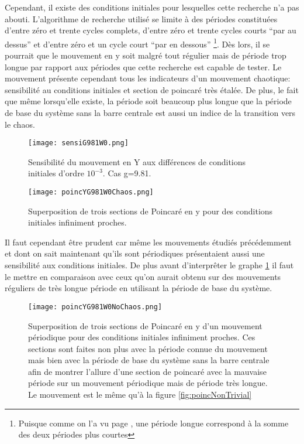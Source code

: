 \documentclass[a4paper]{report}
\begin{document}
Cependant, il existe des conditions initiales pour lesquelles cette recherche n'a pas abouti. L'algorithme de recherche utilisé se limite à des périodes constituées d'entre zéro et trente cycles complets, d'entre zéro et trente cycles courts ``par au dessus'' et d'entre zéro et un cycle court ``par en dessous'' \footnote{Puisque comme on l'a vu page \pageref{propr:sommePeriodes}, une période longue correspond à la somme des deux périodes plus courtes}. Dès lors, il se pourrait que le mouvement en y soit malgré tout régulier mais de période trop longue par rapport aux périodes que cette recherche est capable de tester. Le mouvement présente cependant tous les indicateurs d'un mouvement chaotique: sensibilité au conditions initiales et section de poincaré très étalée. De plus, le fait que même lorsqu'elle existe, la période soit beaucoup plus longue que la période de base du système sans la barre centrale est aussi un indice de la transition vers le chaos.
\begin{figure}[h!]
   \texttt{[image: sensiG981W0.png]}
      \caption[Sensibilité aux conditions initiales: g=9.81 .]{Sensibilité du mouvement en Y aux différences de conditions initiales d'ordre \(10^{-3}\). Cas g=9.81.}
\end{figure}
\begin{figure}[h!]
   \texttt{[image: poincYG981W0Chaos.png]}
      \caption[Section de Poincaré en y: g=9.81 ]{Superposition de trois sections de Poincaré en y pour des conditions initiales infiniment proches.\label{fig:poincGChaos}}
\end{figure}
Il faut cependant être prudent car même les mouvements étudiés précédemment et dont on sait maintenant qu'ils sont périodiques présentaient aussi une sensibilité aux conditions initiales. De plus avant d'interprêter le graphe \ref{fig:poincGChaos} il faut le mettre en comparaison avec ceux qu'on aurait obtenu sur des mouvements réguliers de très longue période en utilisant la période de base du système.
\begin{figure}[h!]
   \texttt{[image: poincYG981W0NoChaos.png]}
      \caption[Section de Poincaré en y d'un mouvement périodique: g=9.81 ]{Superposition de trois sections de Poincaré en y d'un mouvement périodique pour des conditions initiales infiniment proches. Ces sections sont faites non plus avec la période connue du mouvement mais bien avec la période de base du système sans la barre centrale afin de montrer l'allure d'une section de poincaré avec la mauvaise période sur un mouvement périodique mais de période très longue. Le mouvement est le même qu'à la figure \ref{fig:poincNonTrivial}}
\end{figure}
\end{document}

